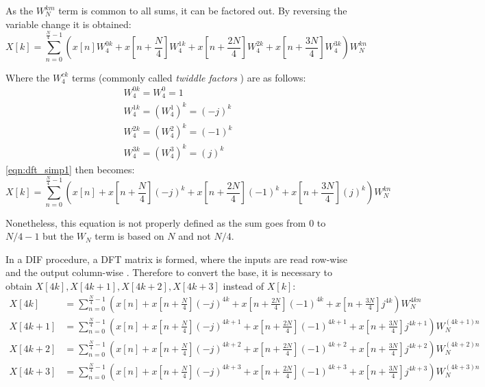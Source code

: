 As the $W_N^{km}$ term is common to all sums, it can be factored out. By reversing the variable change it is obtained:
\begin{equation} \label{eqn:dft_simp1}
	X[k] = \sum_{n = 0}^{\frac{N}{4} - 1}  \left(x[n]W_4^{0k} + x\left[n + \frac{N}{4}\right]W_4^{1k} + x\left[n + \frac{2N}{4}\right]W_4^{2k} + x\left[n + \frac{3N}{4}\right]W_4^{3k}\right)  W_N^{kn}
\end{equation}

Where the $W_4^{ck}$ terms (commonly called \textit{twiddle factors} \cite{Kosaka}) are as follows:
\begin{gather}
	W_4^{0k} = W_4^0 = 1 \\ 
	W_4^{1k} = (W_4^1)^k = (-j)^k \\
	W_4^{2k} = (W_4^2)^k = (-1)^k \\
	W_4^{3k} = (W_4^3)^k = (j)^k
\end{gather}
\cref{eqn:dft_simp1} then becomes:
\begin{equation} \label{eqn:dft_simp2}
	X[k] = \sum_{n = 0}^{\frac{N}{4} - 1}  \left(x[n] + x\left[n + \frac{N}{4}\right](-j)^k + x\left[n + \frac{2N}{4}\right](-1)^k + x\left[n + \frac{3N}{4}\right](j)^k\right)  W_N^{kn}
\end{equation}

Nonetheless, this equation is not properly defined as the sum goes from $0$ to $N/4 -1$ but the $W_N$ term is based on $N$ and not $N/4$.

In a DIF procedure, a DFT matrix is formed, where the inputs are read row-wise and the output column-wise \cite{R4DIF}. Therefore to convert the base, it is necessary to obtain $X[4k], X[4k + 1], X[4k + 2], X[4k + 3]$ instead of $X[k]$:
\begin{align} \label{eqn:troncho}
	X[4k] &= \sum_{n = 0}^{\frac{N}{4} - 1} \left( x[n] + x\left[n + \frac{N}{4}\right](-j)^{4k} + x\left[n + \frac{2N}{4}\right](-1)^{4k} + x\left[n + \frac{3N}{4}\right]j^{4k} \right) W_N^{4kn} \\
	X[4k + 1] &= \sum_{n = 0}^{\frac{N}{4} - 1} \left( x[n] + x\left[n + \frac{N}{4}\right](-j)^{4k + 1} + x\left[n + \frac{2N}{4}\right](-1)^{4k + 1} + x\left[n + \frac{3N}{4}\right]j^{4k + 1} \right) W_N^{(4k + 1)n} \\
	X[4k + 2] &= \sum_{n = 0}^{\frac{N}{4} - 1} \left( x[n] + x\left[n + \frac{N}{4}\right](-j)^{4k + 2} + x\left[n + \frac{2N}{4}\right](-1)^{4k + 2} + x\left[n + \frac{3N}{4}\right]j^{4k + 2} \right) W_N^{(4k + 2)n} \\
	X[4k + 3] &= \sum_{n = 0}^{\frac{N}{4} - 1} \left( x[n] + x\left[n + \frac{N}{4}\right](-j)^{4k + 3} + x\left[n + \frac{2N}{4}\right](-1)^{4k + 3} + x\left[n + \frac{3N}{4}\right]j^{4k + 3} \right) W_N^{(4k + 3)n}
\end{align}

